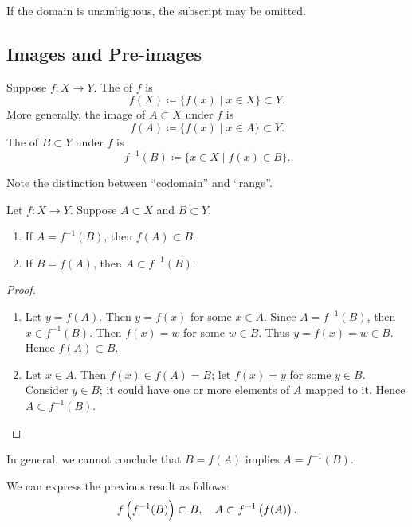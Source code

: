 \begin{notation}
If the domain is unambiguous, the subscript may be omitted.
\end{notation}

\subsection{Images and Pre-images}
\begin{definition}
Suppose $f:X\to Y$. The  of $f$ is
\[f(X)\coloneqq\{f(x)\mid x\in X\}\subset Y.\]
More generally, the image of $A\subset X$ under $f$ is
\[f(A)\coloneqq\{f(x)\mid x\in A\}\subset Y.\]
The  of $B\subset Y$ under $f$ is
\[f^{-1}(B)\coloneqq\{x\in X\mid f(x)\in B\}.\]
\end{definition}

\begin{remark}
Note the distinction between ``codomain'' and ``range''.
\end{remark}

\begin{lemma}
Let $f:X\to Y$. Suppose $A\subset X$ and $B\subset Y$.
\begin{enumerate}[label=(\roman*)]
\item If $A=f^{-1}(B)$, then $f(A)\subset B$.
\item If $B=f(A)$, then $A\subset f^{-1}(B)$. 
\end{enumerate}
\end{lemma}

\begin{proof} \
\begin{enumerate}[label=(\roman*)]
\item Let $y=f(A)$. Then $y=f(x)$ for some $x\in A$. 
Since $A=f^{-1}(B)$, then $x\in f^{-1}(B)$. Then $f(x)=w$ for some $w\in B$. 
Thus $y=f(x)=w\in B$. Hence $f(A)\subset B$.

\item Let $x\in A$. Then $f(x)\in f(A)=B$; let $f(x)=y$ for some $y\in B$. Consider $y\in B$; it could have one or more elements of $A$ mapped to it. Hence $A\subset f^{-1}(B)$. 
\end{enumerate}
\end{proof}

\begin{remark}
In general, we cannot conclude that $B=f(A)$ implies $A=f^{-1}(B)$.
\end{remark}

We can express the previous result as follows:
\[f\left(f^{-1}(B)\right)\subset B,\quad A\subset f^{-1}\left(f(A)\right).\]

